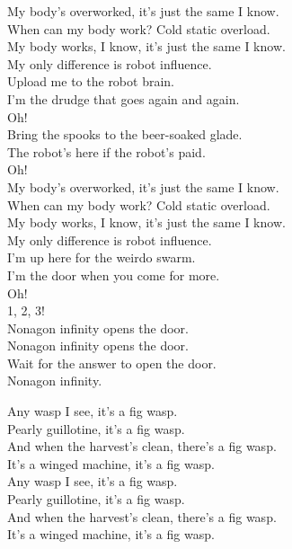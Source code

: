 My body's overworked, it's just the same I know. \\
When can my body work? Cold static overload. \\
My body works, I know, it's just the same I know. \\
My only difference is robot influence. \\

Upload me to the robot brain. \\
I'm the drudge that goes again and again. \\
Oh! \\

Bring the spooks to the beer-soaked glade. \\
The robot's here if the robot's paid. \\
Oh! \\

My body's overworked, it's just the same I know. \\
When can my body work? Cold static overload. \\
My body works, I know, it's just the same I know. \\
My only difference is robot influence. \\

I'm up here for the weirdo swarm. \\
I'm the door when you come for more. \\
Oh! \\

1, 2, 3! \\

Nonagon infinity opens the door. \\
Nonagon infinity opens the door. \\
Wait for the answer to open the door. \\
Nonagon infinity. \\




Any wasp I see, it's a fig wasp. \\
Pearly guillotine, it's a fig wasp. \\
And when the harvest's clean, there's a fig wasp. \\
It's a winged machine, it's a fig wasp. \\

Any wasp I see, it's a fig wasp. \\
Pearly guillotine, it's a fig wasp. \\
And when the harvest's clean, there's a fig wasp. \\
It's a winged machine, it's a fig wasp. \\

